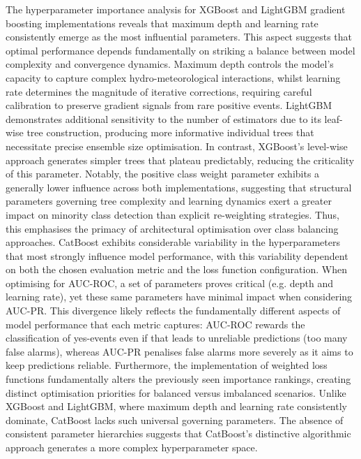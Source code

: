 The  hyperparameter importance analysis for XGBoost and LightGBM gradient boosting implementations reveals that maximum depth and learning rate consistently emerge as the most influential parameters. This aspect suggests that optimal performance depends fundamentally on striking a balance between model complexity and convergence dynamics. Maximum depth controls the model's capacity to capture complex hydro-meteorological interactions, whilst learning rate determines the magnitude of iterative corrections, requiring careful calibration to preserve gradient signals from rare positive events. LightGBM demonstrates additional sensitivity to the number of estimators due to its leaf-wise tree construction, producing more informative individual trees that necessitate precise ensemble size optimisation. In contrast, XGBoost's level-wise approach generates simpler trees that plateau predictably, reducing the criticality of this parameter. Notably, the positive class weight parameter exhibits a generally lower influence across both implementations, suggesting that structural parameters governing tree complexity and learning dynamics exert a greater impact on minority class detection than explicit re-weighting strategies. Thus, this emphasises the primacy of architectural optimisation over class balancing approaches. CatBoost exhibits considerable variability in the hyperparameters that most strongly influence model performance, with this variability dependent on both the chosen evaluation metric and the loss function configuration. When optimising for AUC-ROC, a set of parameters proves critical (e.g. depth and learning rate), yet these same parameters have minimal impact when considering AUC-PR. This divergence likely reflects the fundamentally different aspects of model performance that each metric captures: AUC-ROC rewards the classification of yes-events even if that leads to unreliable predictions (too many false alarms), whereas AUC-PR penalises false alarms more severely as it aims to keep predictions reliable. Furthermore, the implementation of weighted loss functions fundamentally alters the previously seen importance rankings, creating distinct optimisation priorities for balanced versus imbalanced scenarios. Unlike XGBoost and LightGBM, where maximum depth and learning rate consistently dominate, CatBoost lacks such universal governing parameters. The absence of consistent parameter hierarchies suggests that CatBoost's distinctive algorithmic approach generates a more complex hyperparameter space. 

